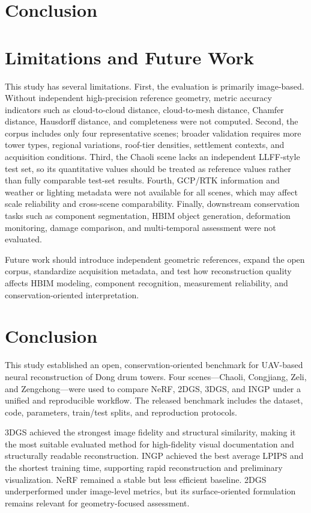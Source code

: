 \section{Conclusion}
\label{sec:conclusion}

\section{Limitations and Future
Work}\label{limitations-and-future-work}

This study has several limitations. First, the evaluation is primarily
image-based. Without independent high-precision reference geometry,
metric accuracy indicators such as cloud-to-cloud distance,
cloud-to-mesh distance, Chamfer distance, Hausdorff distance, and
completeness were not computed. Second, the corpus includes only four
representative scenes; broader validation requires more tower types,
regional variations, roof-tier densities, settlement contexts, and
acquisition conditions. Third, the Chaoli scene lacks an independent
LLFF-style test set, so its quantitative values should be treated as
reference values rather than fully comparable test-set results. Fourth,
GCP/RTK information and weather or lighting metadata were not available
for all scenes, which may affect scale reliability and cross-scene
comparability. Finally, downstream conservation tasks such as component
segmentation, HBIM object generation, deformation monitoring, damage
comparison, and multi-temporal assessment were not evaluated.

Future work should introduce independent geometric references, expand
the open corpus, standardize acquisition metadata, and test how
reconstruction quality affects HBIM modeling, component recognition,
measurement reliability, and conservation-oriented interpretation.

\section{Conclusion}\label{conclusion}

This study established an open, conservation-oriented benchmark for
UAV-based neural reconstruction of Dong drum towers. Four
scenes---Chaoli, Congjiang, Zeli, and Zengchong---were used to compare
NeRF, 2DGS, 3DGS, and INGP under a unified and reproducible workflow.
The released benchmark includes the dataset, code, parameters,
train/test splits, and reproduction protocols.

3DGS achieved the strongest image fidelity and structural similarity,
making it the most suitable evaluated method for high-fidelity visual
documentation and structurally readable reconstruction. INGP achieved
the best average LPIPS and the shortest training time, supporting rapid
reconstruction and preliminary visualization. NeRF remained a stable but
less efficient baseline. 2DGS underperformed under image-level metrics,
but its surface-oriented formulation remains relevant for
geometry-focused assessment.

